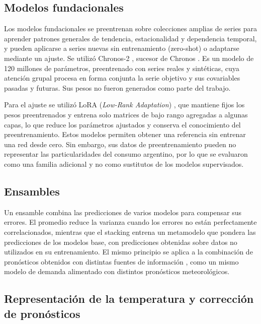\subsection{Modelos fundacionales}
\label{sec:modelos_preentrenados}

Los modelos fundacionales se preentrenan sobre colecciones amplias de series para aprender patrones generales de tendencia, estacionalidad y dependencia temporal, y pueden aplicarse a series nuevas sin entrenamiento (zero-shot) o adaptarse mediante un ajuste. Se utilizó Chronos-2 \cite{ansari2025chronos2}, sucesor de Chronos \cite{ansari2024chronos}. Es un modelo de 120 millones de parámetros, preentrenado con series reales y sintéticas, cuya atención grupal procesa en forma conjunta la serie objetivo y sus covariables pasadas y futuras. Sus pesos no fueron generados como parte del trabajo.

Para el ajuste se utilizó LoRA (\textit{Low-Rank Adaptation}) \cite{hu2022lora}, que mantiene fijos los pesos preentrenados y entrena solo matrices de bajo rango agregadas a algunas capas, lo que reduce los parámetros ajustados y conserva el conocimiento del preentrenamiento. Estos modelos permiten obtener una referencia sin entrenar una red desde cero. Sin embargo, sus datos de preentrenamiento pueden no representar las particularidades del consumo argentino, por lo que se evaluaron como una familia adicional y no como sustitutos de los modelos supervisados.

\subsection{Ensambles}
\label{subsec:modelos_ensambles}

Un ensamble combina las predicciones de varios modelos para compensar sus errores. El promedio reduce la varianza cuando los errores no están perfectamente correlacionados, mientras que el stacking \cite{wolpert1992stacking} entrena un metamodelo que pondera las predicciones de los modelos base, con predicciones obtenidas sobre datos no utilizados en su entrenamiento. El mismo principio se aplica a la combinación de pronósticos obtenidos con distintas fuentes de información \cite{bates1969combination}, como un mismo modelo de demanda alimentado con distintos pronósticos meteorológicos.

\subsection{Representación de la temperatura y corrección de pronósticos}
\label{subsec:grados_dia}
\label{subsec:correccion_pronosticos}

